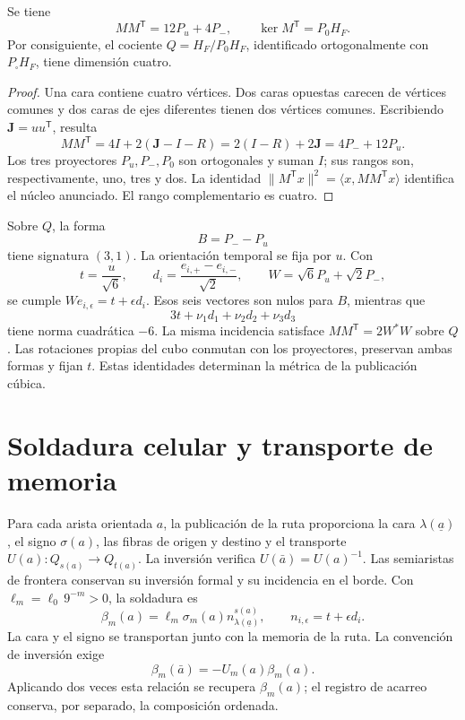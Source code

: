 \begin{proposition}
\label{x_reciprocidad:vii:prop:incidencia}
Se tiene
\[
 MM^{\mathsf T}=12P_u+4P_-,
 \qquad
 \ker M^{\mathsf T}=P_0H_F.
\]
Por consiguiente, el cociente
\(Q=H_F/P_0H_F\), identificado ortogonalmente con
\(P_\square H_F\), tiene dimensión cuatro.
\end{proposition}

\begin{proof}
Una cara contiene cuatro vértices. Dos caras opuestas carecen de vértices
comunes y dos caras de ejes diferentes tienen dos vértices comunes.
Escribiendo \(\mathbf J=uu^{\mathsf T}\), resulta
\[
 MM^{\mathsf T}=4I+2(\mathbf J-I-R)
 =2(I-R)+2\mathbf J=4P_-+12P_u.
\]
Los tres proyectores \(P_u,P_-,P_0\) son ortogonales y suman \(I\);
sus rangos son, respectivamente, uno, tres y dos. La identidad
\(\|M^{\mathsf T}x\|^2=\langle x,MM^{\mathsf T}x\rangle\)
identifica el núcleo anunciado. El rango complementario es cuatro.
\end{proof}

Sobre \(Q\), la forma
\[
 B=P_--P_u
\]
tiene signatura \((3,1)\). La orientación temporal se fija por \(u\).
Con
\[
 t=\frac{u}{\sqrt6},\qquad
 d_i=\frac{e_{i,+}-e_{i,-}}{\sqrt2},\qquad
 W=\sqrt6P_u+\sqrt2P_-,
\]
se cumple \(We_{i,\epsilon}=t+\epsilon d_i\). Esos seis vectores
son nulos para \(B\), mientras que
\[
 3t+\nu_1d_1+\nu_2d_2+\nu_3d_3
\]
tiene norma cuadrática \(-6\). La misma incidencia satisface
\(MM^{\mathsf T}=2W^*W\) sobre \(Q\). Las rotaciones propias del cubo
conmutan con los proyectores, preservan ambas formas y fijan \(t\).
Estas identidades determinan la métrica de la publicación cúbica.

\section{Soldadura celular y transporte de memoria}
\label{x_reciprocidad:vii:sec:soldadura-celular}

Para cada arista orientada \(a\), la publicación de la ruta proporciona
la cara \(\lambda(\underline a)\), el signo
\(\sigma(a)\), las fibras de origen y destino y el transporte
\(U(a):Q_{s(a)}\longrightarrow Q_{t(a)}\).
La inversión verifica \(U(\bar a)=U(a)^{-1}\).
Las semiaristas de frontera conservan su inversión formal y su incidencia
en el borde. Con \(\ell_m=\ell_0\,9^{-m}>0\), la soldadura es
\begin{equation}
 \beta_m(a)=\ell_m\sigma_m(a)
              n_{\lambda(\underline a)}^{s(a)},\qquad
 n_{i,\epsilon}=t+\epsilon d_i.
 \label{x_reciprocidad:vii:eq:soldadura-arista}
\end{equation}
La cara y el signo se transportan junto con la memoria de la ruta.
La convención de inversión exige
\begin{equation}
 \beta_m(\bar a)=-U_m(a)\beta_m(a).
 \label{x_reciprocidad:vii:eq:inversion-soldadura}
\end{equation}
Aplicando dos veces esta relación se recupera \(\beta_m(a)\);
el registro de acarreo conserva, por separado, la composición ordenada.

